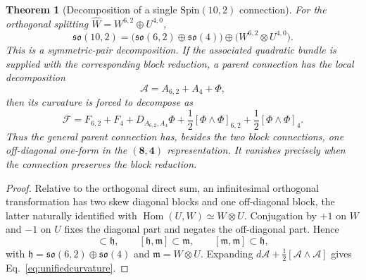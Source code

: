 \documentclass[11pt]{article}
\newtheorem{theorem}{Theorem}[section]
\theoremstyle{definition}\newtheorem{definition}[theorem]{Definition}
\theoremstyle{remark}\newtheorem{remark}[theorem]{Remark}\newtheorem{conjecture}[theorem]{Conjecture}
\begin{document}
\begin{theorem}[Decomposition of a single $\mathrm{Spin}(10,2)$ connection]\label{thm:unifiedconnection}
For the orthogonal splitting $\widehat W=W^{6,2}\oplus U^{4,0}$,
\begin{equation}\label{eq:adjoint102branch}
 \boxed{
 \mathfrak{so}(10,2)
 =\bigl(\mathfrak{so}(6,2)\oplus\mathfrak{so}(4)\bigr)
 \oplus\bigl(W^{6,2}\otimes U^{4,0}\bigr).}
\end{equation}
This is a symmetric-pair decomposition. If the associated quadratic bundle is supplied with the corresponding block reduction, a parent connection has the local decomposition
\begin{equation}
 \mathcal A=A_{6,2}+A_4+\Phi,
\end{equation}
then its curvature is forced to decompose as
\begin{equation}\label{eq:unifiedcurvature}
 \boxed{
 \mathcal F=
 F_{6,2}+F_4+D_{A_{6,2},A_4}\Phi
 +\frac12[\Phi\wedge\Phi]_{6,2}
 +\frac12[\Phi\wedge\Phi]_4.}
\end{equation}
Thus the general parent connection has, besides the two block connections, one off-diagonal one-form in the $(\mathbf8,\mathbf4)$ representation. It vanishes precisely when the connection preserves the block reduction.
\end{theorem}
\begin{proof}
Relative to the orthogonal direct sum, an infinitesimal orthogonal transformation has two skew diagonal blocks and one off-diagonal block, the latter naturally identified with $\operatorname{Hom}(U,W)\simeq W\otimes U$. Conjugation by $+1$ on $W$ and $-1$ on $U$ fixes the diagonal part and negates the off-diagonal part. Hence
\begin{equation}
 [\mathfrak h,\mathfrak h]\subset\mathfrak h,\qquad
 [\mathfrak h,\mathfrak m]\subset\mathfrak m,\qquad
 [\mathfrak m,\mathfrak m]\subset\mathfrak h,
\end{equation}
with $\mathfrak h=\mathfrak{so}(6,2)\oplus\mathfrak{so}(4)$ and
$\mathfrak m=W\otimes U$. Expanding
$d\mathcal A+\tfrac12[\mathcal A\wedge\mathcal A]$ gives Eq.~\eqref{eq:unifiedcurvature}.
\end{proof}
\end{document}
